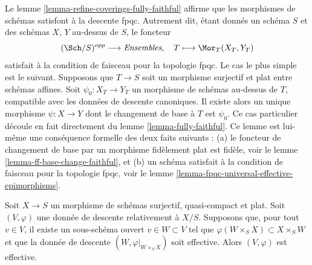 \begin{remark}
\label{remark-morphisms-of-schemes-satisfy-fpqc-descent}
Le lemme \ref{lemma-refine-coverings-fully-faithful} affirme que les
morphismes de schémas satisfont à la descente fpqc. Autrement dit, étant
donnés un schéma $S$ et des schémas $X$, $Y$ au-dessus de $S$, le foncteur
$$
(\Sch/S)^{opp} \longrightarrow \textit{Ensembles},
\quad
T \longmapsto \Mor_T(X_T, Y_T)
$$
satisfait à la condition de faisceau pour la topologie fpqc. Le cas le plus
simple est le suivant. Supposons que $T \to S$ soit un morphisme surjectif et
plat entre schémas affines. Soit $\psi_0 : X_T \to Y_T$ un morphisme de
schémas au-dessus de $T$, compatible avec les données de descente canoniques.
Il existe alors un unique morphisme $\psi : X \to Y$ dont le changement de
base à $T$ est $\psi_0$. Ce cas particulier découle en fait directement du
lemme \ref{lemma-fully-faithful}. Ce lemme est lui-même une conséquence
formelle des deux faits suivants : (a) le foncteur de changement de base par
un morphisme fidèlement plat est fidèle, voir le
lemme \ref{lemma-ff-base-change-faithful}, et (b) un schéma satisfait à la
condition de faisceau pour la topologie fpqc, voir le
lemme \ref{lemma-fpqc-universal-effective-epimorphisms}.
\end{remark}

\begin{lemma}
\label{lemma-effective-for-fpqc-is-local-upstairs}
Soit $X \to S$ un morphisme de schémas surjectif, quasi-compact et plat.
Soit $(V, \varphi)$ une donnée de descente relativement à $X/S$. Supposons que,
pour tout $v \in V$, il existe un sous-schéma ouvert $v \in W \subset V$ tel
que $\varphi(W \times_S X) \subset X \times_S W$ et que la donnée de descente
$(W, \varphi|_{W \times_S X})$ soit effective. Alors $(V, \varphi)$ est
effective.
\end{lemma}

